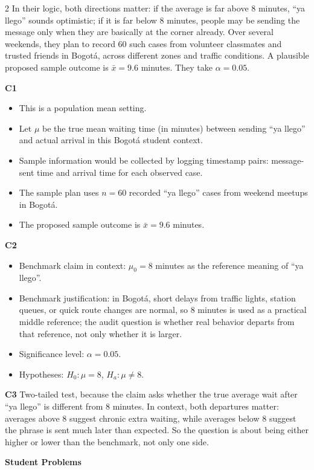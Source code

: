 \documentclass[12pt]{article}
\newcommand{\SubsectionBox}[1]{%
\noindent\colorbox{gray!30}{%
\parbox{\linewidth}{\textbf{#1}}%
}\par\vspace{0.35cm}%
}
\begin{document}
\begin{multicols}{2}
In their logic, both directions matter: if the average is far above 8 minutes, ``ya llego'' sounds optimistic; if it is far below 8 minutes, people may be sending the message only when they are basically at the corner already. Over several weekends, they plan to record 60 such cases from volunteer classmates and trusted friends in Bogotá, across different zones and traffic conditions. A plausible proposed sample outcome is \(\bar{x}=9.6\) minutes. They take \(\alpha=0.05\).

\textbf{C1}
\begin{itemize}
\item This is a population mean setting.
\item Let \(\mu\) be the true mean waiting time (in minutes) between sending ``ya llego'' and actual arrival in this Bogotá student context.
\item Sample information would be collected by logging timestamp pairs: message-sent time and arrival time for each observed case.
\item The sample plan uses \(n=60\) recorded ``ya llego'' cases from weekend meetups in Bogotá.
\item The proposed sample outcome is \(\bar{x}=9.6\) minutes.
\end{itemize}

\textbf{C2}
\begin{itemize}
\item Benchmark claim in context: \(\mu_0=8\) minutes as the reference meaning of ``ya llego''.
\item Benchmark justification: in Bogotá, short delays from traffic lights, station queues, or quick route changes are normal, so 8 minutes is used as a practical middle reference; the audit question is whether real behavior departs from that reference, not only whether it is larger.
\item Significance level: \(\alpha=0.05\).
\item Hypotheses: \(H_0\colon \mu=8\), \(H_a\colon \mu\neq 8\).
\end{itemize}

\textbf{C3}
Two-tailed test, because the claim asks whether the true average wait after ``ya llego'' is different from 8 minutes. In context, both departures matter: averages above 8 suggest chronic extra waiting, while averages below 8 suggest the phrase is sent much later than expected. So the question is about being either higher or lower than the benchmark, not only one side.

\vspace{0.25cm}
\SubsectionBox{Student Problems}\vspace{-0.25cm}


\end{multicols}
\end{document}
